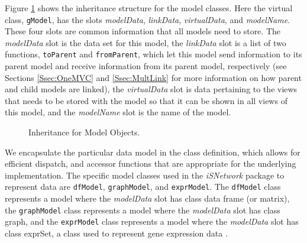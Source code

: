 \documentclass{article}[11pt]
\newcommand{\Rfunction}[1]{{\texttt{#1}}}
\newcommand{\Robject}[1]{{\texttt{#1}}}
\newcommand{\Rpackage}[1]{{\textit{#1}}}
\newcommand{\Rslot}[1]{\textsl{#1}}
\begin{document}
Figure \ref{Fig:Model} shows the inheritance structure for the model classes.
Here the virtual class, \Robject{gModel}, has the slots \Rslot{modelData},
\Rslot{linkData}, \Rslot{virtualData}, and \Rslot{modelName}.  These four
slots are common information that all models need to store.  The
\Rslot{modelData} slot is the data set for this model, the \Rslot{linkData}
slot is a list of two functions, \Rfunction{toParent} and
\Rfunction{fromParent}, which let this model send information to its parent
model and receive information from its parent model, respectively (see
Sections \ref{Ssec:OneMVC} and \ref{Ssec:MultLink} for more information on how
parent and child models are linked), the \Rslot{virtualData} slot is data
pertaining to the views that needs to be stored with the model so that it can
be shown in all views of this model, and the \Rslot{modelName} slot is the
name of the model. 


\begin{figure}[ht]
  \begin{center}
    \caption{ Inheritance for Model Objects. }
    \label{Fig:Model}
  \end{center}
\end{figure}

We encapsulate the particular data model in the class definition, which allows
for efficient dispatch, and accessor functions that are appropriate for the
underlying implementation.  The specific model classes used in the
\Rpackage{iSNetwork} package to represent data are \Robject{dfModel},
\Robject{graphModel}, and \Robject{exprModel}.  The \Robject{dfModel} class
represents a model where the \Rslot{modelData} slot has class data frame (or
matrix), the \Robject{graphModel} class represents a model where the
\Rslot{modelData} slot has class graph, and the \Robject{exprModel} class
represents a model where the \Rslot{modelData} slot has class exprSet, a class
used to represent gene expression data \cite{BioC}.
\end{document}
